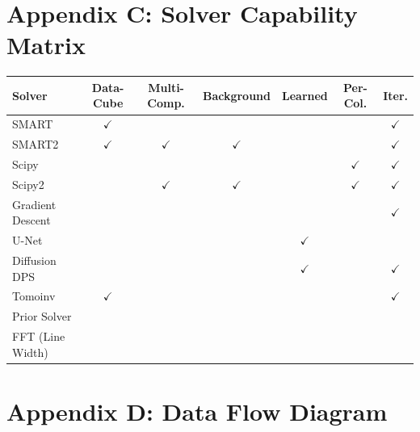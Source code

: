 \documentclass[11pt,a4paper]{article}
\begin{document}
\section{Appendix C: Solver Capability Matrix}

\begin{table}[H]
\centering
\begin{tabular}{lcccccc}
\toprule
\textbf{Solver} & \textbf{Data-Cube} & \textbf{Multi-Comp.} & \textbf{Background} & \textbf{Learned} & \textbf{Per-Col.} & \textbf{Iter.} \\
\midrule
SMART            & $\checkmark$ &               &               &           &           & $\checkmark$ \\
SMART2           & $\checkmark$ & $\checkmark$ & $\checkmark$  &           &           & $\checkmark$ \\
Scipy            &              &               &               &           & $\checkmark$ & $\checkmark$ \\
Scipy2           &              & $\checkmark$ & $\checkmark$  &           & $\checkmark$ & $\checkmark$ \\
Gradient Descent &              &               &               &           &           & $\checkmark$ \\
U-Net            &              &               &               & $\checkmark$ &        &           \\
Diffusion DPS    &              &               &               & $\checkmark$ &        & $\checkmark$ \\
Tomoinv          & $\checkmark$ &               &               &           &           & $\checkmark$ \\
Prior Solver     &              &               &               &           &           &           \\
FFT (Line Width) &              &               &               &           &           &           \\
\bottomrule
\end{tabular}
\end{table}

\section{Appendix D: Data Flow Diagram}
\end{document}
